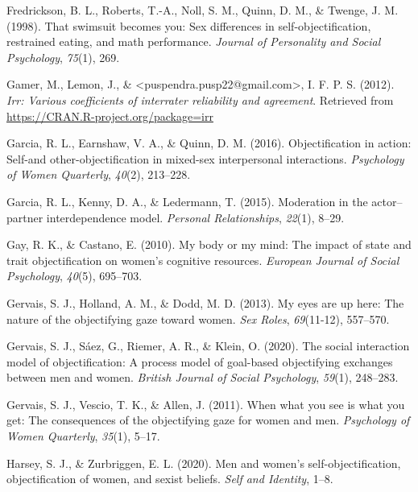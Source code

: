 \documentclass[
  man]{apa6}
\begin{document}
\leavevmode\hypertarget{ref-fredrickson1998swimsuit}{}%
Fredrickson, B. L., Roberts, T.-A., Noll, S. M., Quinn, D. M., \& Twenge, J. M. (1998). That swimsuit becomes you: Sex differences in self-objectification, restrained eating, and math performance. \emph{Journal of Personality and Social Psychology}, \emph{75}(1), 269.

\leavevmode\hypertarget{ref-R-irr}{}%
Gamer, M., Lemon, J., \& \textless puspendra.pusp22@gmail.com\textgreater, I. F. P. S. (2012). \emph{Irr: Various coefficients of interrater reliability and agreement}. Retrieved from \url{https://CRAN.R-project.org/package=irr}

\leavevmode\hypertarget{ref-garcia2016objectification}{}%
Garcia, R. L., Earnshaw, V. A., \& Quinn, D. M. (2016). Objectification in action: Self-and other-objectification in mixed-sex interpersonal interactions. \emph{Psychology of Women Quarterly}, \emph{40}(2), 213--228.

\leavevmode\hypertarget{ref-garcia2015moderation}{}%
Garcia, R. L., Kenny, D. A., \& Ledermann, T. (2015). Moderation in the actor--partner interdependence model. \emph{Personal Relationships}, \emph{22}(1), 8--29.

\leavevmode\hypertarget{ref-gay2010my}{}%
Gay, R. K., \& Castano, E. (2010). My body or my mind: The impact of state and trait objectification on women's cognitive resources. \emph{European Journal of Social Psychology}, \emph{40}(5), 695--703.

\leavevmode\hypertarget{ref-gervais2013my}{}%
Gervais, S. J., Holland, A. M., \& Dodd, M. D. (2013). My eyes are up here: The nature of the objectifying gaze toward women. \emph{Sex Roles}, \emph{69}(11-12), 557--570.

\leavevmode\hypertarget{ref-gervais2020social}{}%
Gervais, S. J., Sáez, G., Riemer, A. R., \& Klein, O. (2020). The social interaction model of objectification: A process model of goal-based objectifying exchanges between men and women. \emph{British Journal of Social Psychology}, \emph{59}(1), 248--283.

\leavevmode\hypertarget{ref-gervais2011you}{}%
Gervais, S. J., Vescio, T. K., \& Allen, J. (2011). When what you see is what you get: The consequences of the objectifying gaze for women and men. \emph{Psychology of Women Quarterly}, \emph{35}(1), 5--17.

\leavevmode\hypertarget{ref-harsey2020men}{}%
Harsey, S. J., \& Zurbriggen, E. L. (2020). Men and women's self-objectification, objectification of women, and sexist beliefs. \emph{Self and Identity}, 1--8.
\end{document}
